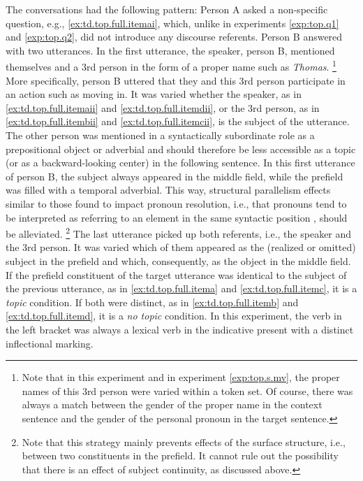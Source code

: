 \largerpage[2]
The conversations had the following pattern:
Person A asked a non-specific question, e.g., \ref{ex:td.top.full.itemai}, which, unlike in experiments \ref*{exp:top.q1} and \ref*{exp:top.q2}, did not introduce any discourse referents. 
Person B answered with two utterances.
In the first utterance, the speaker, person B, mentioned themselves and a 3rd person in the form of a proper name such as \textit{Thomas}.%
\footnote{Note that in this experiment and in experiment \ref{exp:top.s.mv}, the proper names of this 3rd person were varied within a token set.
Of course, there was always a match between the gender of the proper name in the context sentence and the gender of the personal pronoun in the target sentence.}
%
More specifically, person B uttered that they and this 3rd person participate in an action such as moving in.
It was varied whether the speaker, as in \ref{ex:td.top.full.itemaii} and \ref{ex:td.top.full.itemdii}, or the 3rd person, as in \ref{ex:td.top.full.itembii} and \ref{ex:td.top.full.itemcii}, is the subject of the utterance.
The other person was mentioned in a syntactically subordinate role as a prepositional object or adverbial and should therefore be less accessible as a topic (or as a backward-looking center) in the following sentence.
In this first utterance of person B, the subject always appeared in the middle field, while the prefield was filled with a temporal adverbial.
This way, structural parallelism effects similar to those found to impact pronoun resolution, i.e., that pronouns tend to be interpreted as referring to an element in the same syntactic position \citep{smyth1994, chambers.smyth1998}, should be alleviated.%
\footnote{Note that this strategy mainly prevents effects of the surface structure, i.e., between two constituents in the prefield.
It cannot rule out the possibility that there is an effect of subject continuity, as discussed above.}
%
The last utterance picked up both referents, i.e., the speaker and the 3rd person.
It was varied which of them appeared as the (realized or omitted) subject in the prefield and which, consequently, as the object in the middle field.
If the prefield constituent of the target utterance was identical to the subject of the previous utterance, as in \ref{ex:td.top.full.itema} and \ref{ex:td.top.full.itemc}, it is a \textit{topic} condition. If both were distinct, as in \ref{ex:td.top.full.itemb} and \ref{ex:td.top.full.itemd}, it is a \textit{no topic} condition.
In this experiment, the verb in the left bracket was always a lexical verb  in the indicative present with a distinct inflectional marking.

